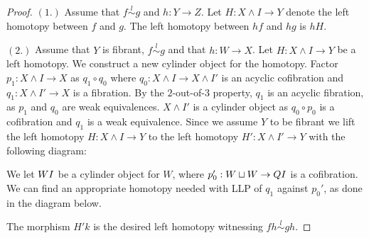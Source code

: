 \documentclass[../thesis.tex]{subfiles}
\begin{document}
            \begin{proof}
                $(1.)$ Assume that $f \overset{l}{\sim} g$ and $h:Y\rightarrow Z$. Let $H: X\wedge I \rightarrow Y$ denote the left homotopy between $f$ and $g$. The left homotopy between $hf$ and $hg$ is $hH$.

                $(2.)$ Assume that $Y$ is fibrant, $f \overset{l}{\sim} g$ and that $h:W\rightarrow X$. Let $H: X\wedge I\rightarrow Y$ be a left homotopy. We construct a new cylinder object for the homotopy. Factor $p_1:X\wedge I \rightarrow X$ as $q_1\circ q_0$ where $q_0: X\wedge I \rightarrow X\wedge I'$ is an acyclic cofibration and $q_1:X\wedge I'\rightarrow X$ is a fibration. By the $2$-out-of-$3$ property, $q_1$ is an acyclic fibration, as $p_1$ and $q_0$ are weak equivalences. $X\wedge I'$ is a cylinder object as $q_0\circ p_0$ is a cofibration and $q_1$ is a weak equivalence. Since we assume $Y$ to be fibrant we lift the left homotopy $H:X\wedge I\rightarrow Y$ to the left homotopy $H':X\wedge I'\rightarrow Y$ with the following diagram:
                \begin{center}
                \end{center}
                We let $W \smash I$ be a cylinder object for $W$, where $p_0': W \sqcup W \rightarrow Q \smash I$ is a cofibration. We can find an appropriate homotopy needed with LLP of $q_1$ against $p_0'$, as done in the diagram below.
                \begin{center}
                \end{center}
                The morphism $H'k$ is the desired left homotopy witnessing $fh \overset{l}{\sim} gh$.


\end{proof}
\end{document}
